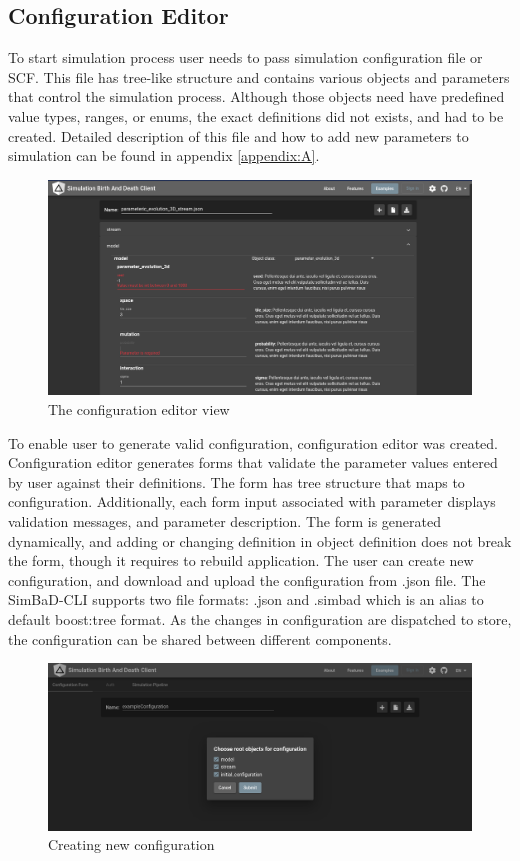 \subsection{Configuration Editor}
To start simulation process user needs to pass simulation configuration file or SCF. This file has tree-like structure and contains various objects and parameters that control the simulation process. Although those objects need have predefined value types, ranges, or enums, the exact definitions did not exists, and had to be created. Detailed description of this file and how to add new parameters to simulation can be found in appendix \ref{appendix:A}.
\begin{figure}[h!]
	\centering
		\includegraphics[width=0.9\linewidth]{screens/conf-view.png}
	\caption{The configuration editor view}
	\label{fig:conf-view}
\end{figure}
To enable user to generate valid configuration, configuration editor was created. Configuration editor generates forms that validate the parameter values entered by user against their definitions. The form has tree structure that maps to configuration. Additionally, each form input associated with parameter displays validation messages, and parameter description. The form is generated dynamically, and adding or changing definition in object definition does not break the form, though it requires to rebuild application. The user can create new configuration, and download and upload the configuration from .json file.  The SimBaD-CLI supports two file formats: .json and .simbad which is an alias to default boost:tree format. As the changes in configuration are dispatched to store, the configuration can be shared between different components. 
\begin{figure}[h!]
	\centering
		\includegraphics[width=0.9\linewidth]{screens/configuration-view-modal.png}
	\caption{Creating new configuration}
	\label{fig:conf-view-new}
\end{figure}
